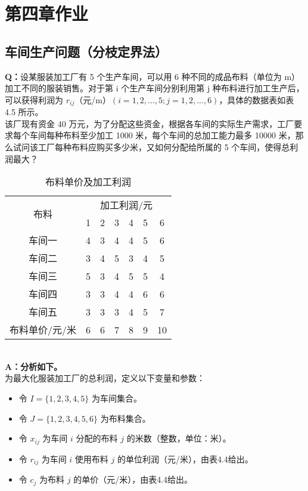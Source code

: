 \ifx\allfiles\undefined

    
    
\else
\fi
\section{第四章作业}
\subsection{车间生产问题（分枝定界法）}
\textbf{Q：}设某服装加工厂有 5 个生产车间，可以用 6 种不同的成品布料（单位为 m）加工不同的服装销售。对于第 i 个生产车间分别利用第 j 种布料进行加工生产后，可以获得利润为 $r_{ij}$（元/m）$(i=1,2,...,5; j=1,2,...,6)$，具体的数据表如表 4.5 所示。\\
该厂现有资金 40 万元，为了分配这些资金，根据各车间的实际生产需求，工厂要求每个车间每种布料至少加工 1000 米，每个车间的总加工能力最多 10000 米，那么试问该工厂每种布料应购买多少米，又如何分配给所属的 5 个车间，使得总利润最大？
\begin{table}[ht]
\centering
\begin{tabular}{|c|c|c|c|c|c|c|}
\hline
\multirow{2}{*}{布料}  & \multicolumn{6}{c|}{加工利润/元} \\ \cline{2-7} 
                      & 1   & 2   & 3   & 4   & 5   & 6   \\ \hline
车间一                  & 4   & 3   & 4   & 4   & 5   & 6   \\ \hline
车间二                  & 3   & 4   & 5   & 3   & 4   & 5   \\ \hline
车间三                  & 5   & 3   & 4   & 5   & 5   & 4   \\ \hline
车间四                  & 3   & 3   & 4   & 4   & 6   & 6   \\ \hline
车间五                  & 3   & 3   & 3   & 4   & 5   & 7   \\ \hline
布料单价/元/米          & 6   & 6   & 7   & 8   & 9   & 10  \\ \hline
\end{tabular}
\caption{布料单价及加工利润}
\end{table}
\\
\textbf{A：分析如下。}\\
为最大化服装加工厂的总利润，定义以下变量和参数：

\begin{itemize}
    \item 令 $I = \{1, 2, 3, 4, 5\}$ 为车间集合。
    \item 令 $J = \{1, 2, 3, 4, 5, 6\}$ 为布料集合。
    \item 令 $x_{ij}$ 为车间 $i$ 分配的布料 $j$ 的米数（整数，单位：米）。
    \item 令 $r_{ij}$ 为车间 $i$ 使用布料 $j$ 的单位利润（元/米），由表4.4给出。
    \item 令 $c_j$ 为布料 $j$ 的单价（元/米），由表4.4给出。
\end{itemize}

